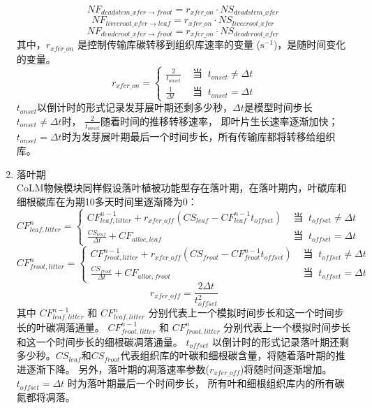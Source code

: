 \begin{enumerate}
\begin{equation}
  NF_{deadstem\_{xfer}\rightarrow froot} = r_{{xfer}\_{on}}\cdot NS_{deadstem\_{xfer}}\ 
\end{equation}
\begin{equation}
  NF_{livecroot\_{xfer}\rightarrow leaf} = r_{{xfer}\_{on}}\cdot NS_{livecroot\_{xfer}}\ 
\end{equation}
\begin{equation}
  NF_{deadcroot\_{xfer}\rightarrow froot} = r_{{xfer}\_{on}}\cdot NS_{deadcroot\_{xfer}}\ 
\end{equation}
其中，$r_{{xfer}\_{on}}$ 是控制传输库碳转移到组织库速率的变量 ($\mathrm{s^{-1}}$)，是随时间变化的变量。
\begin{equation}
r_{xfer\_{on}}=\begin{cases}
\frac{2}{t_{ {onset}}} &  \text{ 当 }\ t_{ {onset}} \neq \Delta t \\ 
\frac{1}{\Delta t} &  \text{ 当 }\ t_{onset}=\Delta t
\end{cases}
\end{equation}
$t_{onset}$以倒计时的形式记录发芽展叶期还剩多少秒，$\Delta t$是模型时间步长$t_{onset}\neq\Delta t$时，
$\frac{2}{t_{onset}}$随着时间的推移转移速率，
即叶片生长速率逐渐加快；$t_{onset}=\Delta t$时为发芽展叶期最后一个时间步长，所有传输库都将转移给组织库。

\item 落叶期 \\
CoLM物候模块同样假设落叶植被功能型存在落叶期，在落叶期内，叶碳库和细根碳库在为期10多天时间里逐渐降为0：
\begin{equation}
CF_{ {leaf,litter }}^{n}=\begin{cases}
CF_{ {leaf,litter }}^{n-1}+r_{xfer\_{off}}\left(CS_{ {leaf }}-CF_{ {leaf }}^{n-1} t_{ {offset }}\right) & \text{ 当 }\ t_{ {offset }} \neq \Delta t \\ 
\frac{CS_{ {leaf }}}{\Delta t}+CF_{ {alloc,leaf }} &  \text{ 当 }\ t_{offset}=\Delta t
\end{cases}
\end{equation}
\begin{equation}
CF_{ {froot },  { litter }}^{n}=\begin{cases}
CF_{ {froot }, litter}^{n-1}+r_{xfer\_off}\left(CS_{ {froot }}-CF_{ {froot }}^{n-1} t_{offset}\right) &  \text{ 当 }\ t_{offset} \neq \Delta t \\ 
\frac{CS_{ {froot }}}{\Delta t}+CF_{ {alloc,froot }} &  \text{ 当 }\ t_{offset}=\Delta t
\end{cases}
\end{equation}
\begin{equation}
r_{xfer\_off}=\frac{2 \Delta t}{t_{offset}^{2}}
\end{equation}
其中 $CF_{leaf,litter}^{n-1}$ 和 $CF_{leaf,litter}^n$ 分别代表上一个模拟时间步长和这一个时间步长的叶碳凋落通量。
$CF_{froot,litter}^{n-1}$ 和 $CF_{froot,litter}^n$ 分别代表上一个模拟时间步长和这一个时间步长的细根碳凋落通量。
$t_{offset}$ 以倒计时的形式记录落叶期还剩多少秒。$CS_{leaf}$和$CS_{froot}$代表组织库的叶碳和细根碳含量，将随着落叶期的推进逐渐下降。
另外，落叶期的凋落速率参数($r_{{xfer}\_{off}}$)将随时间逐渐增加。$t_{offset}=\Delta t$ 时为落叶期最后一个时间步长，
所有叶和细根组织库内的所有碳氮都将凋落。


\end{enumerate}
